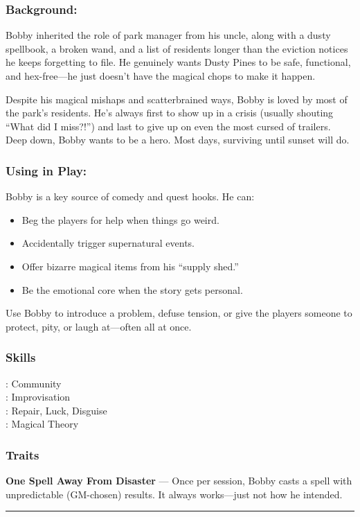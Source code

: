 \begin{paracol}{3}
    \subsubsection*{Background:}
    Bobby inherited the role of park manager from his uncle, along with a dusty spellbook, a broken wand, and a list of residents longer than the eviction notices he keeps forgetting to file. He genuinely wants Dusty Pines to be safe, functional, and hex-free—he just doesn’t have the magical chops to make it happen.

    Despite his magical mishaps and scatterbrained ways, Bobby is loved by most of the park’s residents. He’s always first to show up in a crisis (usually shouting “What did I miss?!”) and last to give up on even the most cursed of trailers. Deep down, Bobby wants to be a hero. Most days, surviving until sunset will do.

    \switchcolumn
    \subsubsection*{Using in Play:}
    Bobby is a key source of comedy and quest hooks. He can:
    \begin{itemize}
      \item Beg the players for help when things go weird.
      \item Accidentally trigger supernatural events.
      \item Offer bizarre magical items from his “supply shed.”
      \item Be the emotional core when the story gets personal.
    \end{itemize}
    Use Bobby to introduce a problem, defuse tension, or give the players someone to protect, pity, or laugh at—often all at once.

    \switchcolumn
    \subsubsection{Skills}
      \noindent\Expert: Community \\
      \noindent\Skilled: Improvisation \\
      \noindent\Novice: Repair, Luck, Disguise \\
      \noindent\Useless: Magical Theory \\
    \subsubsection{Traits}
      \textbf{One Spell Away From Disaster} — Once per session, Bobby casts a spell with unpredictable (GM-chosen) results. It always works—just not how he intended.
\end{paracol}
\vspace{.5\baselineskip}
\hrule
\vspace{.5\baselineskip}

